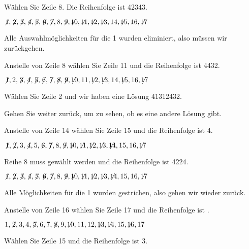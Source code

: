 \noindent Wählen Sie Zeile 8. Die Reihenfolge ist 4{}2{}34{}3\textvisiblespace.

$\not\! 1,\not\! 2,\not\! 3,\not\! 4,\not\! 5,\not\! 6,\not\! 7,8,\not\! 9,\not\!\! 10,\not\!\! 11,\not\!\! 12,\not\!\! 13,14, \not\!\! 15,16,\not\!\! 17$

\noindent Alle Auswahlmöglichkeiten für die 1 wurden eliminiert, also müssen wir zurückgehen.

\smallskip

\noindent Anstelle von Zeile 8 wählen Sie Zeile 11 und die Reihenfolge ist 44{}3{}2.


$\not\! 1,2,\not\! 3,\not\! 4,\not\! 5,\not\! 6,\not\! 7,\not\! 8,\not\! 9,\not\!\! 10,11,\not\!\! 12,\not\!\! 13,14, \not\!\! 15,16,\not\!\! 17$

\noindent Wählen Sie Zeile 2 und wir haben eine Lösung 4{}1{}3{}1{}2{}4{}3{}2.

\smallskip

\noindent Gehen Sie weiter zurück, um zu sehen, ob es eine andere Lösung gibt.

\smallskip

\noindent Anstelle von Zeile 14 wählen Sie Zeile 15 und die Reihenfolge ist 4\textvisiblespace {}.

$\not\! 1,\not\! 2,3,\not\! 4,5,\not\! 6,\not\! 7,8,\not\! 9,\not\!\! 10,\not\!\! 11,\not\!\! 12,\not\!\! 13,\not\!\! 14,15,16,\not\!\! 17$

\noindent Reihe 8 muss gewählt werden und die Reihenfolge ist 4{}22{}4.

$\not\! 1,\not\! 2,\not\! 3,\not\! 4,\not\! 5,\not\! 6,\not\! 7,8,\not\! 9,\not\!\! 10,\not\!\! 11,\not\!\! 12,\not\!\! 13,\not\!\! 14,15,16,\not\!\! 17$

\noindent Alle Möglichkeiten für die 1 wurden gestrichen, also gehen wir wieder zurück.

\smallskip

\noindent Anstelle von Zeile 16 wählen Sie Zeile 17 und die Reihenfolge ist \textvisiblespace \textvisiblespace \textvisiblespace{}\textvisiblespace.

$1,\not\! 2,3,4,\not\! 5,6,7,\not\! 8,9,\not\!\! 10,11,12,\not\!\! 13,\not\!\! 14,15,\not\!\! 16,17$

\noindent Wählen Sie Zeile 15 und die Reihenfolge ist \textvisiblespace{}3.

